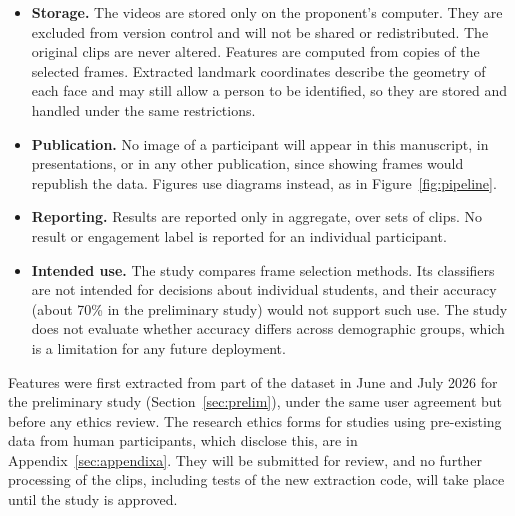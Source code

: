 \begin{itemize}
   \item \textbf{Storage.} The videos are stored only on the proponent's computer. They are excluded from version control and will not be shared or redistributed. The original clips are never altered. Features are computed from copies of the selected frames. Extracted landmark coordinates describe the geometry of each face and may still allow a person to be identified, so they are stored and handled under the same restrictions.
   \item \textbf{Publication.} No image of a participant will appear in this manuscript, in presentations, or in any other publication, since showing frames would republish the data. Figures use diagrams instead, as in Figure~\ref{fig:pipeline}.
   \item \textbf{Reporting.} Results are reported only in aggregate, over sets of clips. No result or engagement label is reported for an individual participant.
   \item \textbf{Intended use.} The study compares frame selection methods. Its classifiers are not intended for decisions about individual students, and their accuracy (about 70\% in the preliminary study) would not support such use. The study does not evaluate whether accuracy differs across demographic groups, which is a limitation for any future deployment.
\end{itemize}

Features were first extracted from part of the dataset in June and July 2026 for the preliminary study (Section~\ref{sec:prelim}), under the same user agreement but before any ethics review. The research ethics forms for studies using pre-existing data from human participants, which disclose this, are in Appendix~\ref{sec:appendixa}. They will be submitted for review, and no further processing of the clips, including tests of the new extraction code, will take place until the study is approved.
